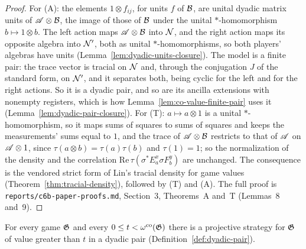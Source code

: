 \begin{proof}
\leanok
For (A): the elements $1 \otimes f_{ij}$, for units $f$ of $\cal{B}$, are unital dyadic matrix units
of $\alg \otimes \cal{B}$, the image of those of $\cal{B}$ under the unital $*$-homomorphism $b
\mapsto 1 \otimes b$. The left action maps $\alg \otimes \cal{B}$ into $\cal{N}$, and the right
action maps its opposite algebra into $\cal{N}'$, both as unital $*$-homomorphisms, so both players'
algebras have units (Lemma~\ref{lem:dyadic-units-closure}). The model is a finite pair: the trace
vector is tracial on $\cal{N}$ and, through the conjugation $J$ of the standard form, on
$\cal{N}'$, and it separates both, being cyclic for the left and for the right actions. So it is a
dyadic pair, and so are its ancilla extensions with nonempty registers, which is how
Lemma~\ref{lem:co-value-finite-pair} uses it (Lemma~\ref{lem:dyadic-pair-closure}). For (T): $a \mapsto a
\otimes 1$ is a unital $*$-homomorphism, so it maps sums of squares to sums of squares and keeps the
measurements' sums equal to $1$, and the trace of $\alg \otimes \cal{B}$ restricts to that of
$\alg$ on $\alg \otimes 1$, since $\tau(a \otimes b) = \tau(a) \tau(b)$ and $\tau(1) = 1$; so the
normalization of the density and the correlation $\mathrm{Re}\, \tau(\sigma^* E^x_a \sigma F^y_b)$
are unchanged. The consequence is the vendored strict form of Lin's tracial density for game values
(Theorem~\ref{thm:tracial-density}), followed by (T) and (A). The full proof is
\texttt{reports/c6b-paper-proofs.md}, Section~3, Theorems~A and~T (Lemmas~8 and~9).
\end{proof}

\begin{lemma}
\label{lem:co-value-finite-pair}
\leanok
For every game $\game$ and every $0 \leq t < \omegaco(\game)$ there is a projective strategy for
$\game$ of value greater than $t$ in a dyadic pair (Definition~\ref{def:dyadic-pair}).
\end{lemma}

